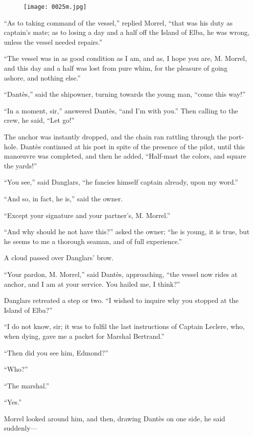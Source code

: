 \begin{figure}[ht]
\texttt{[image: 0025m.jpg]}
\end{figure}

“As to taking command of the vessel,” replied Morrel, “that was his
duty as captain’s mate; as to losing a day and a half off the Island of
Elba, he was wrong, unless the vessel needed repairs.”

“The vessel was in as good condition as I am, and as, I hope you are,
M. Morrel, and this day and a half was lost from pure whim, for the
pleasure of going ashore, and nothing else.”

“Dantès,” said the shipowner, turning towards the young man, “come this
way!”

“In a moment, sir,” answered Dantès, “and I’m with you.” Then calling
to the crew, he said, “Let go!”

The anchor was instantly dropped, and the chain ran rattling through
the port-hole. Dantès continued at his post in spite of the presence of
the pilot, until this manœuvre was completed, and then he added,
“Half-mast the colors, and square the yards!”

“You see,” said Danglars, “he fancies himself captain already, upon my
word.”

“And so, in fact, he is,” said the owner.

“Except your signature and your partner’s, M. Morrel.”

“And why should he not have this?” asked the owner; “he is young, it is
true, but he seems to me a thorough seaman, and of full experience.”

A cloud passed over Danglars’ brow.

“Your pardon, M. Morrel,” said Dantès, approaching, “the vessel now
rides at anchor, and I am at your service. You hailed me, I think?”

Danglars retreated a step or two. “I wished to inquire why you stopped
at the Island of Elba?”

“I do not know, sir; it was to fulfil the last instructions of Captain
Leclere, who, when dying, gave me a packet for Marshal Bertrand.”

“Then did you see him, Edmond?”

“Who?”

“The marshal.”

“Yes.”

Morrel looked around him, and then, drawing Dantès on one side, he said
suddenly—

